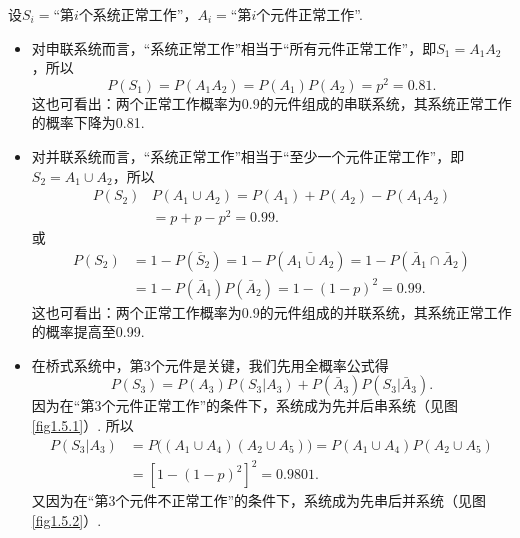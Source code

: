 \begin{solution}
    设$S_i=$“第$i$个系统正常工作”，$A_i=$“第$i$个元件正常工作”.

    \begin{itemize}[(1)]
        \item 对申联系统而言，“系统正常工作”相当于“所有元件正常工作”，即$S_1=A_1A_2$，所以
              \[
                  P(S_1) = P(A_1A_2) = P(A_1)P(A_2) = p^2 = 0.81.
              \]
              这也可看出：两个正常工作概率为0.9的元件组成的串联系统，其系统正常工作的概率下降为0.81.
        \item 对并联系统而言，“系统正常工作”相当于“至少一个元件正常工作”，即$S_2=A_1\cup A_2$，所以
              \begin{align*}
                  P(S_2) & P(A_1\cup A_2) = P(A_1) + P(A_2) - P(A_1A_2) \\
                         & = p + p - p^2 = 0.99.
              \end{align*}
              或
              \begin{align*}
                  P(S_2) & = 1 - P(\bar S_2) = 1 - P(\bar{A_1\cup A_2}) = 1 - P(\bar A_1\cap \bar A_2) \\
                         & = 1 - P(\bar A_1)P(\bar A_2) = 1 - (1-p)^2 = 0.99.
              \end{align*}
              这也可看出：两个正常工作概率为0.9的元件组成的并联系统，其系统正常工作的概率提高至0.99.
        \item 在桥式系统中，第3个元件是关键，我们先用全概率公式得
              \[
                  P(S_3) = P(A_3)P(S_3|A_3) + P(\bar A_3)P(S_3|\bar A_3).
              \]
              因为在“第3个元件正常工作”的条件下，系统成为先并后串系统（见图 \ref{fig1.5.1}）. 所以
              \begin{align*}
                  P(S_3|A_3) & = P\big( ( A_1\cup A_4 )
                  (A_2 \cup A_5) \big) = P(A_1\cup A_4)P(A_2\cup A_5) \\
                             & = [ 1 - (1-p)^2 ]^2 = 0.9801.
              \end{align*}
              又因为在“第3个元件不正常工作”的条件下，系统成为先串后并系统（见图 \ref{fig1.5.2}）.
    \end{itemize}
    \begin{figure}[!ht]
        \centering
        \begin{minipage}{0.48\linewidth}
            \centering
            \begin{tikzpicture}[baseline=(a.base),thick,
                    every node/.style =
                        { minimum width=1cm,minimum height=0.4cm,draw,fill=white}]

\end{tikzpicture}
\end{minipage}
\end{figure}
\end{solution}
